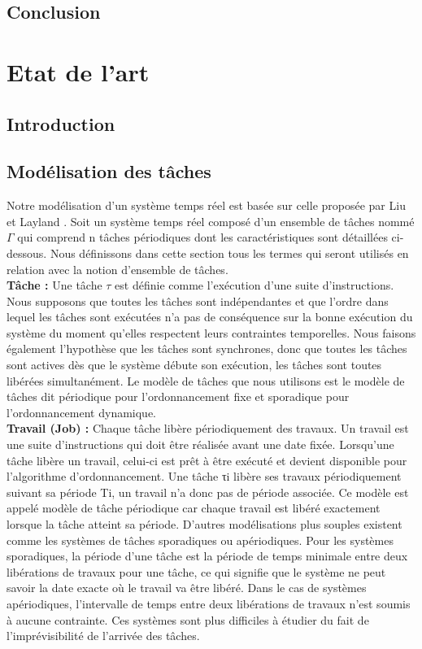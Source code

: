 \section{Conclusion}
\vspace{-1cm}
\chapter{Etat de l'art}
\minitoc
\section{Introduction}
\section{Modélisation des tâches}
\vspace{-1cm}
Notre modélisation d’un système temps réel est basée sur celle proposée par Liu et Layland \cite{LL73}. 
Soit un système temps réel composé d’un ensemble de tâches nommé $\Gamma$ qui comprend n tâches périodiques dont les caractéristiques sont détaillées ci-dessous. Nous définissons dans cette section tous les termes qui seront utilisés en relation avec la notion d’ensemble de tâches.
\\ \indent \textbf{Tâche :} Une tâche $\tau$ est définie comme l’exécution d’une suite d’instructions. Nous supposons que toutes les tâches sont indépendantes et que l’ordre dans lequel les tâches sont exécutées n’a pas de conséquence sur la bonne exécution du système du moment qu’elles respectent leurs contraintes temporelles. Nous faisons également l’hypothèse que les tâches sont synchrones, donc que toutes les tâches sont actives dès que le système débute son exécution, les tâches sont toutes libérées simultanément. Le modèle de tâches que nous utilisons est le modèle de tâches dit périodique pour l’ordonnancement fixe et sporadique pour l’ordonnancement dynamique.
\\ \indent \textbf{Travail (Job) :} Chaque tâche libère périodiquement des travaux. Un travail est une suite d’instructions qui doit être réalisée avant une date fixée. Lorsqu’une tâche libère un travail, celui-ci est prêt à être exécuté et devient disponible pour l’algorithme d’ordonnancement. Une tâche τi libère ses travaux périodiquement suivant sa période Ti, un travail n’a donc pas de période associée. Ce modèle est appelé modèle de tâche périodique car chaque travail est libéré exactement lorsque la tâche atteint sa période. D’autres modélisations plus souples existent comme les systèmes de tâches sporadiques ou apériodiques. Pour les systèmes sporadiques, la période d’une tâche est la période de temps minimale entre deux libérations de travaux pour une tâche, ce qui signifie que le système ne peut savoir la date exacte où le travail va être libéré. Dans le cas de systèmes apériodiques, l’intervalle de temps entre deux libérations de travaux n’est soumis à aucune contrainte. Ces systèmes sont plus diﬃciles à étudier du fait de l’imprévisibilité de l’arrivée des tâches. 
